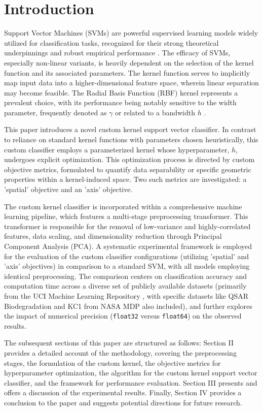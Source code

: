 \documentclass[conference]{IEEEtran}
\begin{document}
\section{Introduction}
Support Vector Machines (SVMs) are powerful supervised learning models widely utilized for classification tasks, recognized for their strong theoretical underpinnings and robust empirical performance \cite{MENEZES20191}. The efficacy of SVMs, especially non-linear variants, is heavily dependent on the selection of the kernel function and its associated parameters. The kernel function serves to implicitly map input data into a higher-dimensional feature space, wherein linear separation may become feasible. The Radial Basis Function (RBF) kernel represents a prevalent choice, with its performance being notably sensitive to the width parameter, frequently denoted as \(\gamma\) or related to a bandwidth \(h\) \cite{MENEZES20191}.

This paper introduces a novel custom kernel support vector classifier. In contrast to reliance on standard kernel functions with parameters chosen heuristically, this custom classifier employs a parameterized kernel whose hyperparameter, \(h\), undergoes explicit optimization. This optimization process is directed by custom objective metrics, formulated to quantify data separability or specific geometric properties within a kernel-induced space. Two such metrics are investigated: a 'spatial' objective and an 'axis' objective.

The custom kernel classifier is incorporated within a comprehensive machine learning pipeline, which features a multi-stage preprocessing transformer. This transformer is responsible for the removal of low-variance and highly-correlated features, data scaling, and dimensionality reduction through Principal Component Analysis (PCA). A systematic experimental framework is employed for the evaluation of the custom classifier configurations (utilizing 'spatial' and 'axis' objectives) in comparison to a standard SVM, with all models employing identical preprocessing. The comparison centers on classification accuracy and computation time across a diverse set of publicly available datasets (primarily from the UCI Machine Learning Repository \cite{UCI}, with specific datasets like QSAR Biodegradation \cite{MANSOURI2013} and KC1 from NASA MDP also included), and further explores the impact of numerical precision (\texttt{float32} versus \texttt{float64}) on the observed results.

The subsequent sections of this paper are structured as follows: Section II provides a detailed account of the methodology, covering the preprocessing stages, the formulation of the custom kernel, the objective metrics for hyperparameter optimization, the algorithm for the custom kernel support vector classifier, and the framework for performance evaluation. Section III presents and offers a discussion of the experimental results. Finally, Section IV provides a conclusion to the paper and suggests potential directions for future research.
\end{document}
